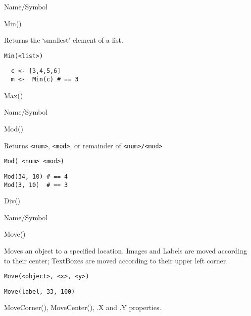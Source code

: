 \rl


\begin{desc}{Name/Symbol}
\item[Name/Symbol]	Min() 

\item[Description]	Returns the `smallest' element of a list.

\item[Usage]	
\begin{verbatim}
Min(<list>)
\end{verbatim}

\item[Example]	
\begin{verbatim}
  c <- [3,4,5,6]
  m <-  Min(c) # == 3
\end{verbatim}

\item[See Also]	Max()
\end{desc}

\rl


\begin{desc}{Name/Symbol}
\item[Name/Symbol]	Mod()

\item[Description]	Returns \verb+<num>+, \verb+<mod>+, or remainder of \verb+<num>/<mod>+

\item[Usage]		
\begin{verbatim}
Mod( <num> <mod>)
\end{verbatim}

\item[Example]	
\begin{verbatim}
Mod(34, 10)	# == 4
Mod(3, 10)	# == 3
\end{verbatim}

\item[See Also]	Div()
\end{desc}

\rl


\begin{desc}{Name/Symbol}
\item[Name/Symbol]	Move()

\item[Description]	Moves an object to a specified location.  
		Images and Labels are moved according to their center; 
		TextBoxes are moved according to their upper left corner.

\item[Usage]
\begin{verbatim}
Move(<object>, <x>, <y>)
\end{verbatim}

\item[Example]	
\begin{verbatim}
Move(label, 33, 100)
\end{verbatim}

\item[See Also]	MoveCorner(), MoveCenter(), .X and .Y properties.
\end{desc}

